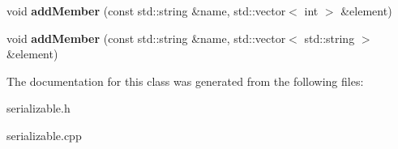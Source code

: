 \begin{DoxyCompactItemize}
\item 
\hypertarget{classg2c_1_1_serializable_aaa28d1e2882c59abedd789d67abefcd9}{
void {\bfseries addMember} (const std::string \&name, std::vector$<$ int $>$ \&element)}
\label{classg2c_1_1_serializable_aaa28d1e2882c59abedd789d67abefcd9}

\item 
\hypertarget{classg2c_1_1_serializable_a9f2781b4b22aa7904bc8447b1adaf544}{
void {\bfseries addMember} (const std::string \&name, std::vector$<$ std::string $>$ \&element)}
\label{classg2c_1_1_serializable_a9f2781b4b22aa7904bc8447b1adaf544}

\end{DoxyCompactItemize}


The documentation for this class was generated from the following files:\begin{DoxyCompactItemize}
\item 
serializable.h\item 
serializable.cpp\end{DoxyCompactItemize}
